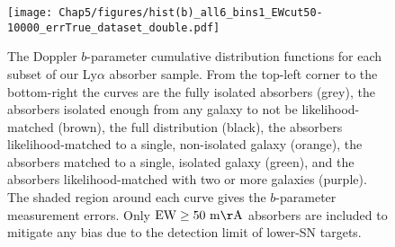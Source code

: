 \begin{figure}[ht!]
        \centering
        \texttt{[image: Chap5/figures/hist(b)\_all6\_bins1\_EWcut50-10000\_errTrue\_dataset\_double.pdf]}
        \caption{\small{The Doppler $b$-parameter cumulative distribution functions for each subset of our Ly$\alpha$ absorber sample. From the top-left corner to the bottom-right the curves are the fully isolated absorbers (grey), the absorbers isolated enough from any galaxy to not be likelihood-matched (brown), the full distribution (black), the absorbers likelihood-matched to a single, non-isolated galaxy (orange), the absorbers matched to a single, isolated galaxy (green), and the absorbers likelihood-matched with two or more galaxies (purple). The shaded region around each curve gives the $b$-parameter measurement errors. Only $\rm EW \ge 50~m\AA$ absorbers are included to mitigate any bias due to the detection limit of lower-SN targets.}}
        \label{cdf_b}
\end{figure}


%
%




